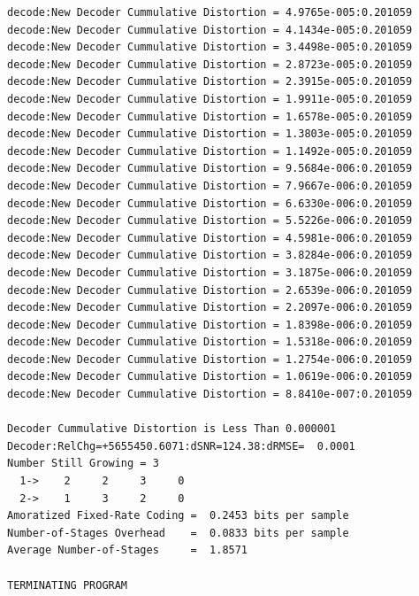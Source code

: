\begin{verbatim}
decode:New Decoder Cummulative Distortion = 4.9765e-005:0.201059
decode:New Decoder Cummulative Distortion = 4.1434e-005:0.201059
decode:New Decoder Cummulative Distortion = 3.4498e-005:0.201059
decode:New Decoder Cummulative Distortion = 2.8723e-005:0.201059
decode:New Decoder Cummulative Distortion = 2.3915e-005:0.201059
decode:New Decoder Cummulative Distortion = 1.9911e-005:0.201059
decode:New Decoder Cummulative Distortion = 1.6578e-005:0.201059
decode:New Decoder Cummulative Distortion = 1.3803e-005:0.201059
decode:New Decoder Cummulative Distortion = 1.1492e-005:0.201059
decode:New Decoder Cummulative Distortion = 9.5684e-006:0.201059
decode:New Decoder Cummulative Distortion = 7.9667e-006:0.201059
decode:New Decoder Cummulative Distortion = 6.6330e-006:0.201059
decode:New Decoder Cummulative Distortion = 5.5226e-006:0.201059
decode:New Decoder Cummulative Distortion = 4.5981e-006:0.201059
decode:New Decoder Cummulative Distortion = 3.8284e-006:0.201059
decode:New Decoder Cummulative Distortion = 3.1875e-006:0.201059
decode:New Decoder Cummulative Distortion = 2.6539e-006:0.201059
decode:New Decoder Cummulative Distortion = 2.2097e-006:0.201059
decode:New Decoder Cummulative Distortion = 1.8398e-006:0.201059
decode:New Decoder Cummulative Distortion = 1.5318e-006:0.201059
decode:New Decoder Cummulative Distortion = 1.2754e-006:0.201059
decode:New Decoder Cummulative Distortion = 1.0619e-006:0.201059
decode:New Decoder Cummulative Distortion = 8.8410e-007:0.201059

Decoder Cummulative Distortion is Less Than 0.000001
Decoder:RelChg=+5655450.6071:dSNR=124.38:dRMSE=  0.0001
Number Still Growing = 3
  1->    2     2     3     0 
  2->    1     3     2     0 
Amoratized Fixed-Rate Coding =  0.2453 bits per sample
Number-of-Stages Overhead    =  0.0833 bits per sample
Average Number-of-Stages     =  1.8571

TERMINATING PROGRAM
\end{verbatim}
\normalsize



\clearpage
\newpage
\normalsize



